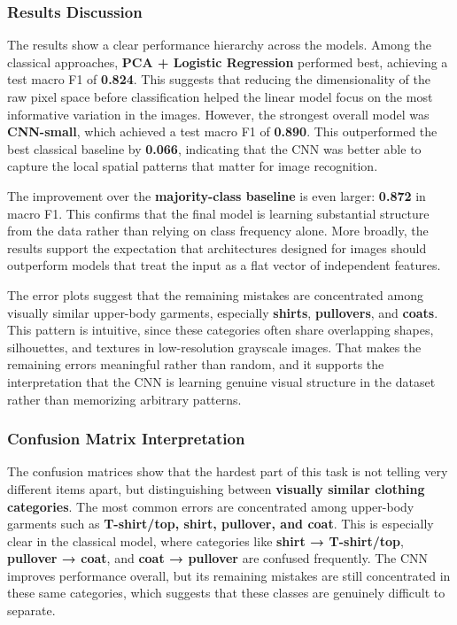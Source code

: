 \documentclass[11pt]{article}
\begin{document}
    \subsubsection{Results Discussion}\label{results-discussion}

The results show a clear performance hierarchy across the models. Among
the classical approaches, \textbf{PCA + Logistic Regression} performed
best, achieving a test macro F1 of \textbf{0.824}. This suggests that
reducing the dimensionality of the raw pixel space before classification
helped the linear model focus on the most informative variation in the
images. However, the strongest overall model was \textbf{CNN-small},
which achieved a test macro F1 of \textbf{0.890}. This outperformed the
best classical baseline by \textbf{0.066}, indicating that the CNN was
better able to capture the local spatial patterns that matter for image
recognition.

The improvement over the \textbf{majority-class baseline} is even
larger: \textbf{0.872} in macro F1. This confirms that the final model
is learning substantial structure from the data rather than relying on
class frequency alone. More broadly, the results support the expectation
that architectures designed for images should outperform models that
treat the input as a flat vector of independent features.

The error plots suggest that the remaining mistakes are concentrated
among visually similar upper-body garments, especially \textbf{shirts},
\textbf{pullovers}, and \textbf{coats}. This pattern is intuitive, since
these categories often share overlapping shapes, silhouettes, and
textures in low-resolution grayscale images. That makes the remaining
errors meaningful rather than random, and it supports the interpretation
that the CNN is learning genuine visual structure in the dataset rather
than memorizing arbitrary patterns.

\subsubsection{Confusion Matrix
Interpretation}\label{confusion-matrix-interpretation}

The confusion matrices show that the hardest part of this task is not
telling very different items apart, but distinguishing between
\textbf{visually similar clothing categories}. The most common errors
are concentrated among upper-body garments such as \textbf{T-shirt/top,
shirt, pullover, and coat}. This is especially clear in the classical
model, where categories like \textbf{shirt → T-shirt/top},
\textbf{pullover → coat}, and \textbf{coat → pullover} are confused
frequently. The CNN improves performance overall, but its remaining
mistakes are still concentrated in these same categories, which suggests
that these classes are genuinely difficult to separate.
\end{document}
